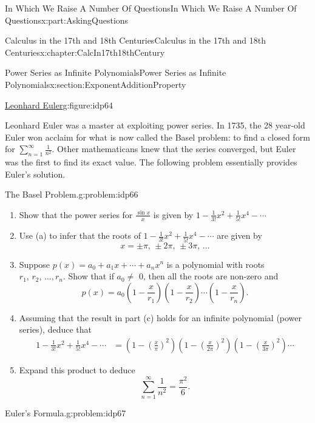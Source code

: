 \documentclass[oneside,10pt,]{book}
\numberwithin{equation}{section}
\newcommand{\amp}{&}
\begin{document}
\begin{partptx}{In Which We Raise A Number Of Questions}{}{In Which We Raise A Number Of Questions}{}{}{x:part:AskingQuestions}
\begin{chapterptx}{Calculus in the 17th and 18th Centuries}{}{Calculus in the 17th and 18th Centuries}{}{}{x:chapter:CalcIn17th18thCentury}
\begin{sectionptx}{Power Series as Infinite Polynomials}{}{Power Series as Infinite Polynomials}{}{}{x:section:ExponentAdditionProperty}
\begin{figureptx}{\href{https://mathshistory.st-andrews.ac.uk/Biographies/Euler/}{Leonhard Euler}\protect\footnotemark{}}{g:figure:idp64}{}
\begin{image}{0.325}{0.35}{0.325}
\end{image}%
\tcblower
\end{figureptx}%
%
Leonhard Euler was a master at exploiting power series. In 1735, the 28 year-old Euler won acclaim for what is now called the Basel problem: to find a closed form for \(\sum_{n=1}^\infty\frac{1}{n^2}\). Other mathematicans knew that the series converged, but Euler was the first to find its exact value. The following problem essentially provides Euler's solution.%
\begin{problem}{The Basel Problem.}{g:problem:idp66}%
\begin{enumerate}[font=\bfseries,label=(\alph*),ref=\alph*]
\item{}Show that the power series for \(\frac{\sin x}{x}\) is given by \(1-\frac{1}{3!}x^2+\frac{1}{5!}x^4-\cdots\)%
\item{}Use (a) to infer that the roots of \(1-\frac{1}{3!}x^2+\frac{1}{5!}x^4-\cdots\) are given by%
\begin{equation*}
x=\pm\pi,\,\pm 2\pi,\,\pm 3\pi,\,\ldots
\end{equation*}
%
\item{}Suppose \(p(x)=a_0+a_1x+\cdots+a_nx^n\) is a polynomial with roots \(r_1,\,r_2,\,\ldots,r_n\). Show that if \(a_0\neq\) \(0\), then all the roots are non-zero and%
\begin{equation*}
p(x)=a_0\left(1-\frac{x}{r_1}\right)\left(1-\frac{x}{r_2}\right)\cdots\left(1-\frac{x}{r_n}\right)\text{.}
\end{equation*}
%
\item{}Assuming that the result in part (c) holds for an infinite polynomial (power series), deduce that%
\begin{align*}
1-\frac{1}{3!}x^2+\frac{1}{5!}x^4-\cdots\amp =\left(1-\left(\frac{x}{\pi}\right)^2\right)\left(1-\left(\frac{x}{2\pi}\right)^2\right)\left(1-\left(\frac{x}{3\pi}\right)^2\right)\cdots
\end{align*}
%
\item{}Expand this product to deduce%
\begin{equation*}
\sum_{n=1}^\infty\frac{1}{n^2}=\frac{\pi^2}{6}.{}
\end{equation*}
%
\end{enumerate}
\end{problem}
\begin{problem}{Euler's Formula.}{g:problem:idp67}%
\begin{enumerate}[font=\bfseries,label=(\alph*),ref=\alph*]

\end{enumerate}
\end{problem}
\end{sectionptx}
\end{chapterptx}
\end{partptx}
\end{document}
